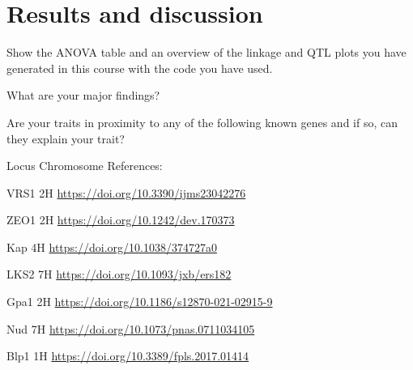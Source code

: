 \section{Results and discussion}

Show the ANOVA table and an overview of the linkage and QTL plots you have generated in this course with the code you have used.

What are your major findings?

Are your traits in proximity to any of the following known genes and if so, can they explain your trait?

Locus Chromosome References:

VRS1 2H \url{https://doi.org/10.3390/ijms23042276}

ZEO1 2H \url{https://doi.org/10.1242/dev.170373}

Kap 4H \url{https://doi.org/10.1038/374727a0}

LKS2 7H \url{https://doi.org/10.1093/jxb/ers182}

Gpa1 2H \url{https://doi.org/10.1186/s12870-021-02915-9}

Nud 7H \url{https://doi.org/10.1073/pnas.0711034105}

Blp1 1H \url{https://doi.org/10.3389/fpls.2017.01414}
